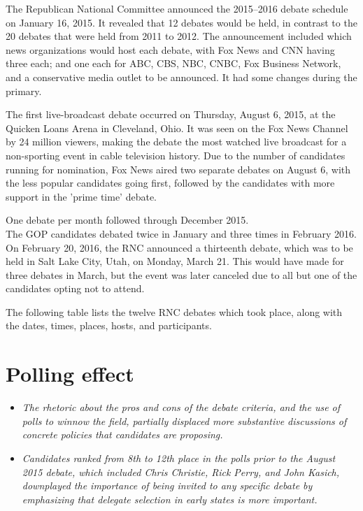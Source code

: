 The Republican National Committee announced the 2015--2016 debate
schedule on January 16, 2015. It revealed that 12 debates would be held,
in contrast to the 20 debates that were held from 2011 to 2012. The
announcement included which news organizations would host each debate,
with Fox News and CNN having three each; and one each for ABC, CBS, NBC,
CNBC, Fox Business Network, and a conservative media outlet to be
announced. It had some changes during the primary.

The first live-broadcast debate occurred on Thursday, August 6, 2015, at
the Quicken Loans Arena in Cleveland, Ohio. It was seen on the Fox News
Channel by 24 million viewers, making the debate the most watched live
broadcast for a non-sporting event in cable television history. Due to
the number of candidates running for nomination, Fox News aired two
separate debates on August 6, with the less popular candidates going
first, followed by the candidates with more support in the 'prime time'
debate.

One debate per month followed through December 2015.\\
The GOP candidates debated twice in January and three times in February
2016. On February 20, 2016, the RNC announced a thirteenth debate, which
was to be held in Salt Lake City, Utah, on Monday, March 21. This would
have made for three debates in March, but the event was later canceled
due to all but one of the candidates opting not to attend.

The following table lists the twelve RNC debates which took place, along
with the dates, times, places, hosts, and participants.

\section{Polling effect}\label{polling-effect}

\begin{itemize}
\item
  \emph{The rhetoric about the pros and cons of the debate criteria, and
  the use of polls to winnow the field, partially displaced more
  substantive discussions of concrete policies that candidates are
  proposing.}
\item
  \emph{Candidates ranked from 8th to 12th place in the polls prior to
  the August 2015 debate, which included Chris Christie, Rick Perry, and
  John Kasich, downplayed the importance of being invited to any
  specific debate by emphasizing that delegate selection in early states
  is more important.}
\end{itemize}

